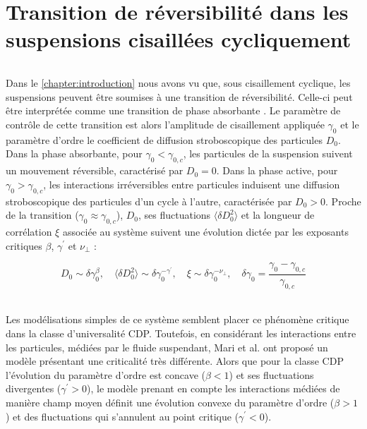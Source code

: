 \chapter{Transition de réversibilité dans les suspensions cisaillées cycliquement}

\label{chapter:Susp}

\subparagraph{}Dans le \autoref{chapter:introduction} nous avons vu que, sous cisaillement cyclique, les suspensions peuvent être soumises à une transition de réversibilité. Celle-ci peut être interprétée comme une transition de phase absorbante \cite{pine_chaos_2005, corte_random_2008, tjhung_criticality_2016, ge_rheology_2022}. Le paramètre de contrôle de cette transition est alors l'amplitude de cisaillement appliquée $\gamma_0$ et le paramètre d'ordre le coefficient de diffusion stroboscopique des particules $D_0$. Dans la phase absorbante, pour $\gamma_0 < \gamma_{0,c}$, les particules de la suspension suivent un mouvement réversible, caractérisé par $D_0 = 0$. Dans la phase active, pour $\gamma_0 > \gamma_{0,c}$, les interactions irréversibles entre particules induisent une diffusion stroboscopique des particules d'un cycle à l'autre, caractérisée par $D_0 >0$. Proche de la transition ($\gamma_0\approx\gamma_{0,c}$), $D_0$, ses fluctuations $\langle \delta D_0^2 \rangle$ et la longueur de corrélation $\xi$ associée au système suivent une évolution dictée par les exposants critiques $\beta$, $\gamma^\prime$ et $\nu_\perp$ : 

\begin{equation}
	D_0 \sim \delta\gamma_0^\beta, \quad \langle \delta D_0^2 \rangle \sim \delta\gamma_0^{-\gamma^\prime},\quad \xi \sim \delta\gamma_0^{-\nu_\perp}, \quad \delta\gamma_0 = \frac{\gamma_0-\gamma_{0,c}}{\gamma_{0,c}}
\end{equation}

\subparagraph{}Les modélisations simples de ce système \cite{corte_random_2008, tjhung_criticality_2016, ge_rheology_2022} semblent placer ce phénomène critique dans la classe d'universalité CDP. Toutefois, en considérant les interactions entre les particules, médiées par le fluide suspendant, Mari et al. \cite{mari_absorbing_2022} ont proposé un modèle présentant une criticalité très différente. Alors que pour la classe CDP l'évolution du paramètre d'ordre est concave ($\beta < 1$) et ses fluctuations divergentes ($\gamma^\prime>0$), le modèle prenant en compte les interactions médiées de manière champ moyen définit une évolution convexe du paramètre d'ordre ($\beta >1$) et des fluctuations qui s'annulent au point critique ($\gamma^\prime < 0$).

